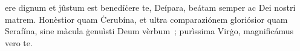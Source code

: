 ere dignum et jûstum est benedíċere te, Deípara, beátam semper ac Dei nostri matrem. Honèstior quam Ċerubína, et ultra comparaziónem gloriósior quam Serafína, sine màcula ġenuìsti Deum vèrbum~; purìssima Virġo, magnificámus vero te.
